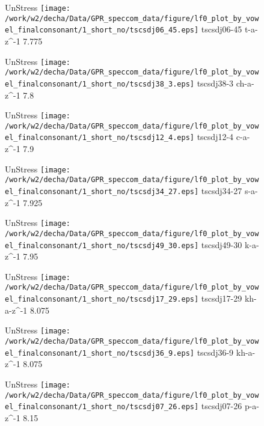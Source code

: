 \documentclass{article}
\begin{document}
\begin{figure}[t]
\begin{minipage}[b]{.24\textwidth}
UnStress
\centering
\texttt{[image: /work/w2/decha/Data/GPR\_speccom\_data/figure/lf0\_plot\_by\_vowel\_finalconsonant/1\_short\_no/tscsdj06\_45.eps]}
tscsdj06-45 t-a-z\textasciicircum-1 7.775
\end{minipage}
\begin{minipage}[b]{.24\textwidth}
UnStress
\centering
\texttt{[image: /work/w2/decha/Data/GPR\_speccom\_data/figure/lf0\_plot\_by\_vowel\_finalconsonant/1\_short\_no/tscsdj38\_3.eps]}
tscsdj38-3 ch-a-z\textasciicircum-1 7.8
\end{minipage}
\begin{minipage}[b]{.24\textwidth}
UnStress
\centering
\texttt{[image: /work/w2/decha/Data/GPR\_speccom\_data/figure/lf0\_plot\_by\_vowel\_finalconsonant/1\_short\_no/tscsdj12\_4.eps]}
tscsdj12-4 c-a-z\textasciicircum-1 7.9
\end{minipage}
\begin{minipage}[b]{.24\textwidth}
UnStress
\centering
\texttt{[image: /work/w2/decha/Data/GPR\_speccom\_data/figure/lf0\_plot\_by\_vowel\_finalconsonant/1\_short\_no/tscsdj34\_27.eps]}
tscsdj34-27 s-a-z\textasciicircum-1 7.925
\end{minipage}
\end{figure}
\clearpage
\begin{figure}[t]
\begin{minipage}[b]{.24\textwidth}
UnStress
\centering
\texttt{[image: /work/w2/decha/Data/GPR\_speccom\_data/figure/lf0\_plot\_by\_vowel\_finalconsonant/1\_short\_no/tscsdj49\_30.eps]}
tscsdj49-30 k-a-z\textasciicircum-1 7.95
\end{minipage}
\begin{minipage}[b]{.24\textwidth}
UnStress
\centering
\texttt{[image: /work/w2/decha/Data/GPR\_speccom\_data/figure/lf0\_plot\_by\_vowel\_finalconsonant/1\_short\_no/tscsdj17\_29.eps]}
tscsdj17-29 kh-a-z\textasciicircum-1 8.075
\end{minipage}
\begin{minipage}[b]{.24\textwidth}
UnStress
\centering
\texttt{[image: /work/w2/decha/Data/GPR\_speccom\_data/figure/lf0\_plot\_by\_vowel\_finalconsonant/1\_short\_no/tscsdj36\_9.eps]}
tscsdj36-9 kh-a-z\textasciicircum-1 8.075
\end{minipage}
\begin{minipage}[b]{.24\textwidth}
UnStress
\centering
\texttt{[image: /work/w2/decha/Data/GPR\_speccom\_data/figure/lf0\_plot\_by\_vowel\_finalconsonant/1\_short\_no/tscsdj07\_26.eps]}
tscsdj07-26 p-a-z\textasciicircum-1 8.15
\end{minipage}
\end{figure}
\end{document}

